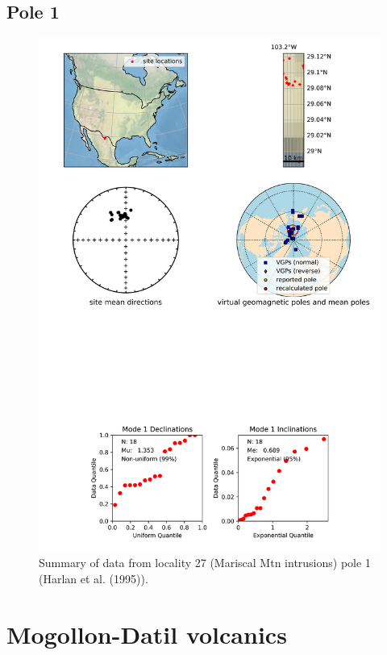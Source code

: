 \subsection{Pole 1}


\begin{figure}[H]
\centering
\includegraphics[width=5 in]{./27/1/pole_summary.png}
\caption{Summary of data from locality 27 (Mariscal Mtn intrusions) pole 1 (Harlan et al. (1995)).}
\end{figure}

\section{Mogollon-Datil volcanics}
